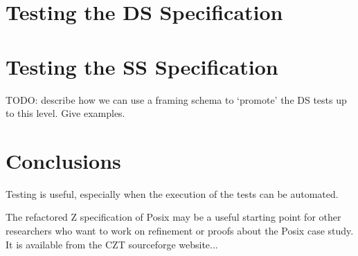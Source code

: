 \documentclass{llncs}
\begin{document}
\section{Testing the DS Specification}




\section{Testing the SS Specification}

TODO: describe how we can use a framing schema to `promote' the DS tests
up to this level.  Give examples.


\section{Conclusions}

Testing is useful, especially when the execution of the tests can
be automated.

The refactored Z specification of Posix may be a useful starting point
for other researchers who want to work on refinement or proofs
about the Posix case study.  It is available from the CZT sourceforge
website...


%
%


%
\end{document}
